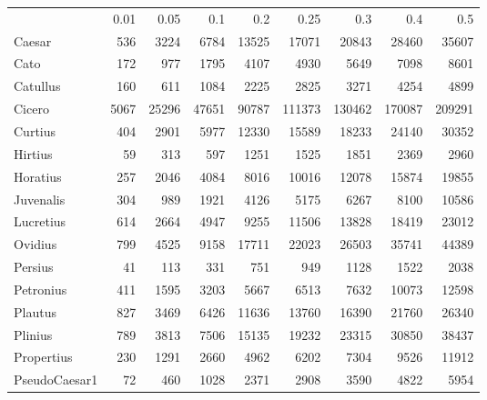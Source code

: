 \begin{table}[h]
\begin{tabular}{lrrrrrrrr}
\hline
               &     0.01 &     0.05 &      0.1 &      0.2 &      0.25 &      0.3 &      0.4 &      0.5 \\
 Caesar        &   536    &  3224    &   6784   &  13525   &  17071    &  20843   &  28460   &  35607   \\
 Cato          &   172    &   977    &   1795   &   4107   &   4930    &   5649   &   7098   &   8601   \\
 Catullus      &   160    &   611    &   1084   &   2225   &   2825    &   3271   &   4254   &   4899   \\
 Cicero        &  5067    & 25296    &  47651   &  90787   & 111373    & 130462   & 170087   & 209291   \\
 Curtius       &   404    &  2901    &   5977   &  12330   &  15589    &  18233   &  24140   &  30352   \\
 Hirtius       &    59    &   313    &    597   &   1251   &   1525    &   1851   &   2369   &   2960   \\
 Horatius      &   257    &  2046    &   4084   &   8016   &  10016    &  12078   &  15874   &  19855   \\
 Juvenalis     &   304    &   989    &   1921   &   4126   &   5175    &   6267   &   8100   &  10586   \\
 Lucretius     &   614    &  2664    &   4947   &   9255   &  11506    &  13828   &  18419   &  23012   \\
 Ovidius       &   799    &  4525    &   9158   &  17711   &  22023    &  26503   &  35741   &  44389   \\
 Persius       &    41    &   113    &    331   &    751   &    949    &   1128   &   1522   &   2038   \\
 Petronius     &   411    &  1595    &   3203   &   5667   &   6513    &   7632   &  10073   &  12598   \\
 Plautus       &   827    &  3469    &   6426   &  11636   &  13760    &  16390   &  21760   &  26340   \\
 Plinius       &   789    &  3813    &   7506   &  15135   &  19232    &  23315   &  30850   &  38437   \\
 Propertius    &   230    &  1291    &   2660   &   4962   &   6202    &   7304   &   9526   &  11912   \\
 PseudoCaesar1 &    72    &   460    &   1028   &   2371   &   2908    &   3590   &   4822   &   5954   \\

\end{tabular}
\end{table}
